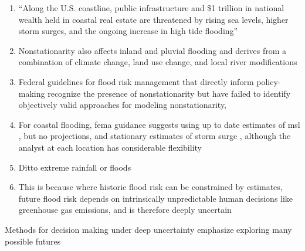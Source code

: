 \documentclass[11pt]{article}
\begin{document}
\begin{enumerate}
    \item ``Along the U.S. coastline, public infrastructure and \$1 trillion in national wealth held in coastal real estate are threatened by rising sea levels, higher storm surges, and the ongoing increase in high tide flooding'' \citep{reidmiller_reportinbrief:2018}
    \item Nonstationarity also affects inland and pluvial flooding \citep{Milly:2008dg} and derives from a combination of climate change, land use change, and local river modifications \citep{Merz:2014gf}
    \item Federal guidelines for flood risk management that directly inform policy-making recognize the presence of nonstationarity but have failed to identify objectively valid approaches for modeling nonstationarity, \citep{Montanari:2014hl,Serinaldi:2015bq}
    \item For coastal flooding, \gls{fema} guidance suggests using up to date estimates of \gls{msl} \citep{fema_slr:2016}, but no projections, and stationary estimates of storm surge \citep{fema_ffa:2016}, although the analyst at each location has considerable flexibility
    \item Ditto extreme rainfall \citep{atlas14_texas:2018} or floods \citep{bulletin17c:2019}
    \item This is because where historic flood risk can be constrained by estimates, future flood risk depends on intrinsically unpredictable human decisions like greenhouse gas emissions, and is therefore deeply uncertain \citep{keller_management:2021}
\end{enumerate}
Methods for decision making under deep uncertainty emphasize exploring many possible futures
\end{document}
